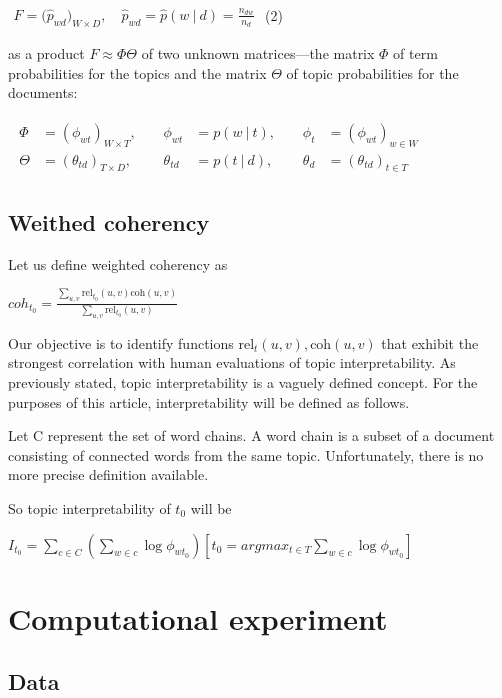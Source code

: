 \documentclass{article}
\begin{document}
$\begin{aligned} F = \bigl ( \hat{p}_{wd} \bigr )_{W{\times }D}, \quad \hat{p}_{wd} = \hat{p}(w\ {\vert }\ d) = \tfrac{n_{dw}}{n_d}  \end{aligned}$ (2)

as a product $F \approx \Phi \Theta $ of two unknown matrices—the matrix $\Phi$ of term probabilities for the topics and the matrix $\Theta$ of topic probabilities for the documents:

$\begin{aligned} \begin{array}{rlrlrl} \Phi &{}= (\phi _{wt})_{W{\times }T},\;\;\;\; &{} \phi _{wt} &{}= p(w\ {\vert }\ t),\;\;\;\; &{} \phi _t &{}= (\phi _{wt})_{w\in W} \\ \Theta &{}= (\theta _{td})_{T{\times }D},\;\;\;\; &{} \theta _{td} &{}= p(t\ {\vert }\ d),\;\;\;\; &{} \theta _d &{}= (\theta _{td})_{t\in T}\end{array} \end{aligned}$

\subsection{Weithed coherency}

Let us define weighted coherency as 

$coh_{t_0} = \frac {\sum_{u, v} \text{rel}_{t_0}(u, v) \text{coh}(u, v)} {\sum_{u, v}  \text{rel}_{t_0}(u, v)}$

Our objective is to identify functions $\text{rel}_t(u, v), \text{coh}(u, v)$  that exhibit the strongest correlation with human evaluations of topic interpretability. As previously stated, topic interpretability is a vaguely defined concept. For the purposes of this article, interpretability will be defined as follows.

Let C represent the set of word chains. A word chain is a subset of a document consisting of connected words from the same topic. Unfortunately, there is no more precise definition available.

So topic interpretability of $t_0$ will be

$I_{t_0} = \sum_{c \in C} \left(\sum_{w \in c} \log{\phi_{wt_0}}\right) [t_0 = argmax_{t \in T} \sum_{w \in c} \log{\phi_{wt_0}}]$

\section{Computational experiment}
\subsection{Data}
\end{document}
